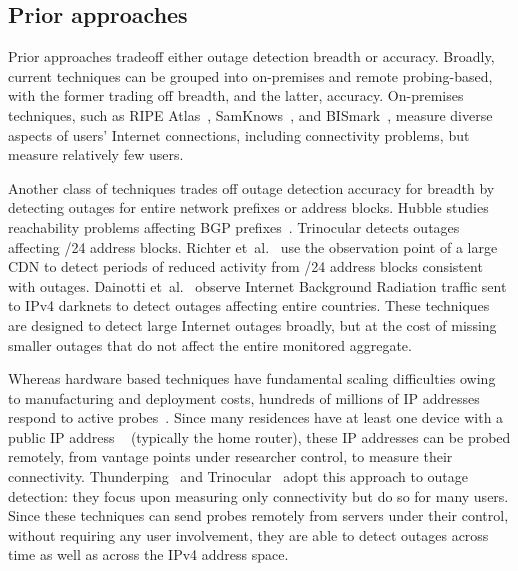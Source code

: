 \subsection{Prior approaches}

Prior approaches tradeoff either outage detection breadth or
accuracy. Broadly, current techniques can be grouped into on-premises
and remote probing-based, with the former trading off breadth, and the
latter, accuracy. On-premises techniques, such as RIPE
Atlas~\cite{atlas}, SamKnows~\cite{samknows}, and
BISmark~\cite{bismark-main-bib}, measure diverse aspects of users'
Internet connections, including connectivity problems, but measure
relatively few users.

Another class of techniques trades off outage detection accuracy for
breadth by detecting outages for entire network prefixes or address
blocks. Hubble studies reachability problems affecting BGP
prefixes~\cite{hubble}. Trinocular detects outages affecting /24
address blocks. Richter et~al.~\cite{advancing-outage-art} use the
observation point of a large CDN to detect periods of reduced activity
from /24 address blocks consistent with outages. Dainotti
et~al.~\cite{dainotti-imc11} observe Internet Background Radiation
traffic sent to IPv4 darknets to detect outages affecting entire
countries. These techniques are designed to detect large Internet
outages broadly, but at the cost of missing smaller outages that do
not affect the entire monitored aggregate.

Whereas hardware based techniques have fundamental scaling
difficulties owing to manufacturing and deployment costs, hundreds of
millions of IP addresses respond to active
probes~\cite{timeouts}. Since many residences have at least one device
with a public IP address ~\cite{cgn-imc16} (typically the home
router), these IP addresses can be probed remotely, from vantage
points under researcher control, to measure their
connectivity. Thunderping~\cite{pingin} and
Trinocular~\cite{trinocular} adopt this approach to outage detection:
they focus upon measuring only connectivity but do so for many
users. Since these techniques can send probes remotely from servers
under their control, without requiring any user involvement, they are
able to detect outages across time as well as across the IPv4 address
space.



